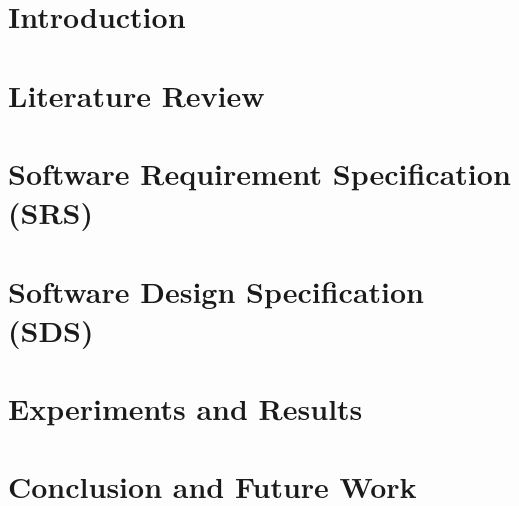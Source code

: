 \documentclass[12pt,twosided]{report}
\begin{document}
\tableofcontents
\listoffigures
\listoftables


\chapter{Introduction}
\label{chap:intro}


\chapter{Literature Review}
\label{chap:lit}


\chapter{Software Requirement Specification (SRS)}
\label{chap:srs}


\chapter{Software Design Specification (SDS)}
\label{chap:sds}


\chapter{Experiments and Results}
\label{chap:results}


\chapter{Conclusion and Future Work}
\label{chap:outro}

\end{document}
